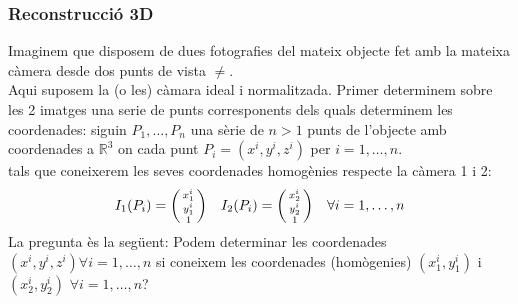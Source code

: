 \documentclass[../main.tex]{subfiles}
\begin{document}
	\subsubsection{Reconstrucció 3D}
	Imaginem que disposem de dues fotografies del mateix objecte fet amb la mateixa càmera desde dos punts de vista $\neq$.\\
	Aqui suposem la (o les) càmara ideal i normalitzada. Primer determinem sobre les 2 imatges una serie de punts corresponents dels quals determinem les coordenades:
	siguin $P_1, \dots, P_n$ una sèrie de $n > 1$ punts de l'objecte amb coordenades a $\mathbb{R}^3$ on cada punt $P_i = \left(x^i, y^i, z^i\right)$ per $i = 1, \dots, n$.\\
	tals que coneixerem les seves coordenades homogènies respecte la càmera 1 i 2:
	\begin{displaymath}
		I_1(P_i) = \begin{psmallmatrix}x_1^i\\y_1^i\\1\end{psmallmatrix}\quad I_2(P_i) = \begin{psmallmatrix}x_2^i\\y_2^i\\1\end{psmallmatrix} \quad \forall i = 1, \dots, n
	\end{displaymath}
	La pregunta ès la següent: Podem determinar les coordenades $(x^i, y^i, z^i) \forall i = 1, \dots, n$ si coneixem les coordenades (homògenies) $(x_1^i, y_1^i)$ i $(x_2^i, y_2^i)$ $\forall i = 1, \dots, n$?
\end{document}
